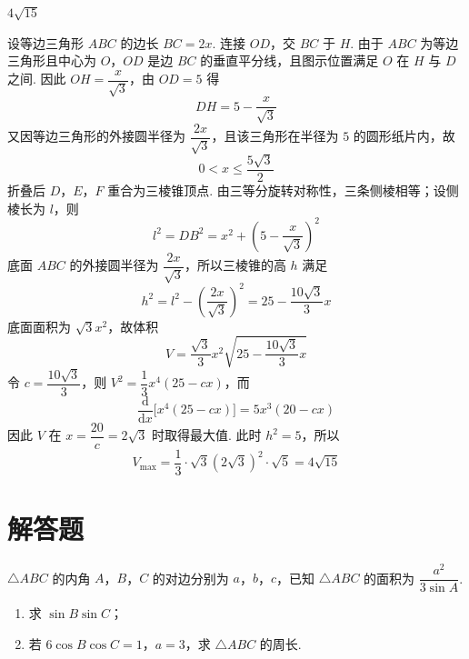 \begin{answer}
\(4\sqrt{15}\)
\end{answer}

\begin{solution}
设等边三角形 \(ABC\) 的边长 \(BC=2x\). 连接 \(OD\)，交 \(BC\) 于 \(H\). 由于 \(ABC\) 为等边三角形且中心为 \(O\)，\(OD\) 是边 \(BC\) 的垂直平分线，且图示位置满足 \(O\) 在 \(H\) 与 \(D\) 之间. 因此 \(OH=\dfrac{x}{\sqrt3}\)，由 \(OD=5\) 得
\[
DH=5-\frac{x}{\sqrt3}
\]
又因等边三角形的外接圆半径为 \(\dfrac{2x}{\sqrt3}\)，且该三角形在半径为 \(5\) 的圆形纸片内，故
\[
0<x\le\frac{5\sqrt3}{2}
\]
折叠后 \(D\)，\(E\)，\(F\) 重合为三棱锥顶点. 由三等分旋转对称性，三条侧棱相等；设侧棱长为 \(l\)，则
\[
l^2=DB^2=x^2+\left(5-\frac{x}{\sqrt3}\right)^2
\]
底面 \(ABC\) 的外接圆半径为 \(\dfrac{2x}{\sqrt3}\)，所以三棱锥的高 \(h\) 满足
\[
h^2=l^2-\left(\frac{2x}{\sqrt3}\right)^2
=25-\frac{10\sqrt3}{3}x
\]
底面面积为 \(\sqrt3x^2\)，故体积
\[
V=\frac{\sqrt3}{3}x^2\sqrt{25-\frac{10\sqrt3}{3}x}
\]
令 \(c=\dfrac{10\sqrt3}{3}\)，则 \(V^2=\dfrac13x^4(25-cx)\)，而
\[
\frac{\mathrm d}{\mathrm dx}\bigl[x^4(25-cx)\bigr]
=5x^3(20-cx)
\]
因此 \(V\) 在 \(x=\dfrac{20}{c}=2\sqrt3\) 时取得最大值. 此时 \(h^2=5\)，所以
\[
V_{\max}=\frac13\cdot\sqrt3(2\sqrt3)^2\cdot\sqrt5=4\sqrt{15}
\]
\end{solution}

\section{解答题}

\begin{problem}
\(\triangle ABC\) 的内角 \(A\)，\(B\)，\(C\) 的对边分别为 \(a\)，\(b\)，\(c\)，已知 \(\triangle ABC\) 的面积为 \(\dfrac{a^2}{3\sin A}\).

\begin{enumerate}
\item 求 \(\sin B\sin C\)；
\item 若 \(6\cos B\cos C=1\)，\(a=3\)，求 \(\triangle ABC\) 的周长.
\end{enumerate}
\end{problem}


